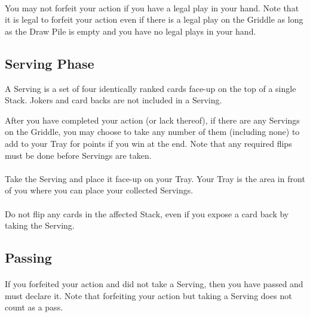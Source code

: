 \documentclass{article}
\begin{document}
\paragraph{\label{par:forfeitactionrestriction}}
You may not forfeit your action if you have a legal play in your hand. Note that it is legal to forfeit your action even if there is a legal play on the Griddle as long as the Draw Pile is empty and you have no legal plays in your hand.

\subsection{Serving Phase \label{sec:servingphase}}

A Serving is a set of four identically ranked cards face-up on the top of a single Stack. Jokers and card backs are not included in a Serving.

After you have completed your action (or lack thereof), if there are any Servings on the Griddle, you may choose to take any number of them (including none) to add to your Tray for points if you win at the end. Note that any required flips must be done before Servings are taken.

\paragraph{\label{par:takeserving}}
Take the Serving and place it face-up on your Tray. Your Tray is the area in front of you where you can place your collected Servings.

\paragraph{\label{par:servingexpose}}
Do not flip any cards in the affected Stack, even if you expose a card back by taking the Serving.

\subsection{Passing \label{sec:passing}}

\paragraph{\label{par:passdef}}
If you forfeited your action and did not take a Serving, then you have passed and must declare it. Note that forfeiting your action but taking a Serving does not count as a pass.
\end{document}
